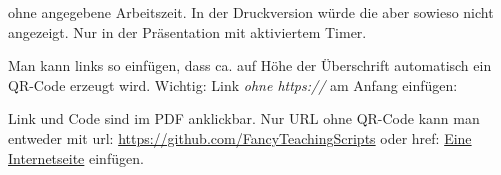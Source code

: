 {
        ohne angegebene Arbeitszeit. In der Druckversion würde die aber sowieso nicht angezeigt. Nur in der Präsentation mit aktiviertem Timer.

    Man kann links so einfügen, dass ca. auf Höhe der Überschrift automatisch ein QR-Code erzeugt wird. Wichtig: Link \emph{ohne https://} am Anfang einfügen: 
    
    Link und Code sind im PDF anklickbar. Nur URL ohne QR-Code kann man entweder mit url: \url{https://github.com/FancyTeachingScripts} oder href: \href{https://valentin-herrmann.com/}{Eine Internetseite} einfügen.

}
